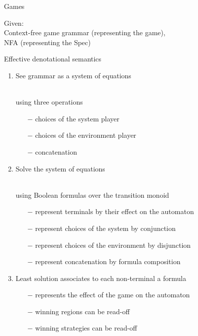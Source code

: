 \documentclass[../talk.tex]{subfiles}
\begin{document}
\begin{frame}{Games}
    \begin{overlayarea}{\slidewidth}{\slideheight}
        Given:
        \\
        \quad Context-free game grammar (representing the game),
        \\
        \quad NFA (representing the Spec)

        \vspace*{1em}


        \alert{Effective denotational semantics}

        \begin{enumerate}
            \item See grammar as a \alert{system of equations}
                {%
                    \\
                    \quad using three operations
                    \begin{itemize}
                        \item[$-$] choices of the system player
                        \item[$-$] choices of the environment player
                        \item[$-$] concatenation
                    \end{itemize}
                }
            \item<2-> \alert{Solve} the system of equations
                {%
                    \\
                    using Boolean formulas over the transition monoid
                    \begin{itemize}
                        \item[$-$] represent terminals by their effect on the automaton
                        \item[$-$] represent choices of the system by conjunction
                        \item[$-$] represent choices of the environment by disjunction
                        \item[$-$] represent concatenation by \alert{formula composition}
                    \end{itemize}
                }
            \item<3-> Least solution associates to each non-terminal a formula
                {%
                    \begin{itemize}
                        \item[$-$] represents the effect of the game on the automaton
                        \item[$-$] winning regions can be read-off
                        \item[$-$] winning strategies can be read-off
                    \end{itemize}
                }
        \end{enumerate}


\end{overlayarea}
\end{frame}
\end{document}
